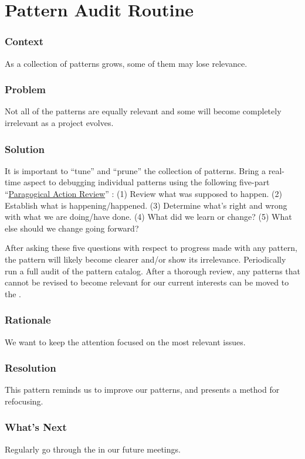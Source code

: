 \section{Pattern Audit Routine}\label{sec:Pattern_Audit_Routine}

\subsubsection*{Context} As a collection of patterns grows, some of them may lose relevance.

\subsubsection*{Problem} Not all of the patterns are equally relevant and some will become completely irrelevant as a project evolves.

\subsubsection*{Solution} It is important to ``tune'' and ``prune'' the collection of patterns.  Bring a real-time aspect to debugging individual patterns using the following five-part ``\href{http://metameso.org/~joe/docs/The-Paragogical-Action-Review.pdf}{Paragogical Action Review}'' \cite[Chapter 28]{peeragogy-handbook}:
(1) Review what was supposed to happen.
(2) Establish what is happening/happened.
(3) Determine what’s right and wrong with what we are doing/have done.
(4) What did we learn or change?
(5) What else should we change going forward?

After asking these five questions with respect to progress made with any pattern, the pattern will likely become clearer and/or show its irrelevance.  Periodically run a full audit of the pattern catalog.   After a thorough review, any patterns that cannot be revised to become relevant for our current interests can be moved to the .

\subsubsection*{Rationale} We want to keep the attention focused on the most relevant issues.

\subsubsection*{Resolution} This pattern reminds us to improve our patterns, and presents a method for refocusing.

\subsubsection*{What's Next} Regularly go through the  in our future meetings.
